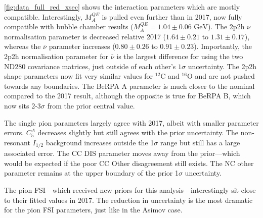 \autoref{fig:data_full_red_xsec} shows the interaction parameters which are mostly compatible. Interestingly, $M_A^{QE}$ is pulled even further than in 2017, now fully compatible with bubble chamber results ($M_A^{QE}=1.04\pm0.06\text{ GeV}$). The 2p2h $\nu$ normalisation parameter is decreased relative 2017 ($1.64\pm0.21$ to $1.31\pm0.17$), whereas the $\bar{\nu}$ parameter increases ($0.80\pm0.26$ to $0.91\pm0.23$). Importantly, the 2p2h normalisation parameter for $\bar{\nu}$ is the largest difference for using the two ND280 covariance matrices, just outside of each other's $1\sigma$ uncertainty. The 2p2h shape parameters now fit very similar values for $^{12}\text{C}$ and $^{16}\text{O}$ and are not pushed towards any boundaries. The BeRPA A parameter is much closer to the nominal compared to the 2017 result, although the opposite is true for BeRPA B, which now sits 2-3$\sigma$ from the prior central value.

The single pion parameters largely agree with 2017, albeit with smaller parameter errors. $C_5^A$ decreases slightly but still agrees with the prior uncertainty. The non-resonant $I_{1/2}$ background increases outside the 1$\sigma$ range but still has a large associated error. The CC DIS parameter moves away from the prior---which would be expected if the poor CC Other disagreement still exists. The NC other parameter remains at the upper boundary of the prior 1$\sigma$ uncertainty.

The pion FSI---which received new priors for this analysis---interestingly sit close to their fitted values in 2017. The reduction in uncertainty is the most dramatic for the pion FSI parameters, just like in the Asimov case.

